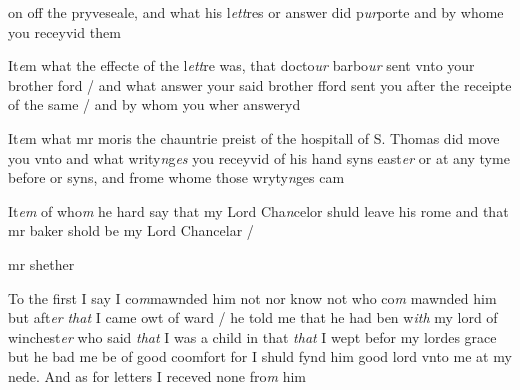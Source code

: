 \documentclass[12pt, a4paper]{book}
\begin{document}
               on off
			 the pryveseale, and what his l\textit{ett}res or answer did p\textit{ur}porte
and by whome you receyvid them
            		
				\marginpar[\vspace{0.5cm}{\textcolor{Gray}{3}}]{}
			

		\ifthenelse{\isodd{\thepage}}
		{\reversemarginpar}
		{\normalmarginpar}
		 It\textit{e}m what the effecte of the l\textit{ett}re was, that docto\textit{ur} barbo\textit{ur} 
sent vnto your brother ford / and what answer
your said brother fford sent you after the receipte
of the same / and by whom you wher answeryd
            		
				\marginpar[\vspace{0.5cm}{\textcolor{Gray}{4}}]{}
			

		\ifthenelse{\isodd{\thepage}}
		{\reversemarginpar}
		{\normalmarginpar}
		 It\textit{e}m what mr moris the chauntrie preist of the hospitall
of S. Thomas did move you vnto and what writy\textit{n}g\textit{es}
you receyvid of his hand syns east\textit{er} or at any tyme
before or syns, and frome whome those wryty\textit{n}ges 
cam
            		
				\marginpar[\vspace{0.5cm}{\textcolor{Gray}{5}}]{}
			

		\ifthenelse{\isodd{\thepage}}
		{\reversemarginpar}
		{\normalmarginpar}
		 It\textit{em} of who\textit{m} he hard say that my Lord Cha\textit{n}celor
shuld leave his rome and that mr baker
shold be my Lord Chancelar /

		\ifthenelse{\isodd{\thepage}}
		{\reversemarginpar}
		{\normalmarginpar}
		mr shether
            		
            			
				\marginpar[\vspace{0.5cm}{\textcolor{Gray}{servand}}]{}
			
            			
		\ifthenelse{\isodd{\thepage}}
		{\reversemarginpar}
		{\normalmarginpar}
		To the first I say I co\textit{m}mawnded him not nor know not who co\textit{m}           				mawnded him but aft\textit{er}
            				\textit{that} I came owt of ward / he told me that
            				he had ben w\textit{ith} my lord of winchest\textit{er} who said \textit{that} I was a child in 
            				that \textit{that} I wept befor my lordes grace  but he bad me be of good
            				coomfort for I shuld fynd him good lord vnto me at my nede.
            				And as for letters I receved none fro\textit{m} him
            		
\end{document}
